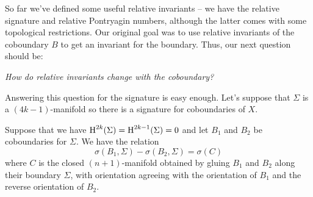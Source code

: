 So far we've defined some useful relative invariants -- we have the relative signature and relative Pontryagin numbers, although the latter comes with some topological restrictions. Our original goal was to use relative invariants of the coboundary $B$ to get an invariant for the boundary. Thus, our next question should be:
\begin{center}
	\textsl{How do relative invariants change with the coboundary?}
\end{center}
Answering this question for the signature is easy enough. Let's suppose that $\Sigma$ is a $(4k-1)$-manifold so there is a signature for coboundaries of $X$.

\begin{proposition}\label{prop:signature_variation}
	Suppose that we have $\operatorname{H}^{2k}(\Sigma)=\operatorname{H}^{2k-1}(\Sigma)=0$ and
	let $B_1$ and $B_2$ be coboundaries for $\Sigma$. We have the relation
	\begin{equation}\label{eq:signature_variation}
		\sigma(B_1, \Sigma) - \sigma(B_2, \Sigma) = \sigma(C)
	\end{equation}
	where $C$ is the closed $(n+1)$-manifold obtained by gluing $B_1$ and $B_2$ along their boundary $\Sigma$, with orientation agreeing with the orientation of $B_1$ and the reverse orientation of $B_2$.
\end{proposition}
